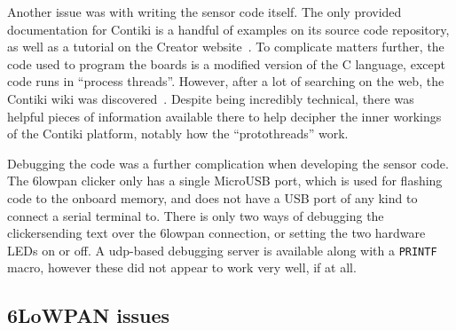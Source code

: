 Another issue was with writing the sensor code itself. The only provided
documentation for Contiki is a handful of examples on its source code
repository, as well as a tutorial on the Creator
website~\cite{clickersetupguide}. To complicate matters further, the code
used to program the boards is a modified version of the C language, except
code runs in ``process threads''. However, after a lot of searching on the
web, the Contiki wiki was discovered~\cite{contiki-wiki}. Despite being
incredibly technical, there was helpful pieces of information available there
to help decipher the inner workings of the Contiki platform, notably how the
``protothreads'' work.

Debugging the code was a further complication when developing the sensor
code. The \gls{6lowpan} clicker only has a single MicroUSB port, which is
used for flashing code to the onboard memory, and does not have a USB port of
any kind to connect a serial terminal to. There is only two ways of debugging
the clicker\textemdash{}sending text over the \gls{6lowpan} connection, or
setting the two hardware LEDs on or off. A \acrshort{udp}-based debugging
server is available along with a \texttt{PRINTF} macro, however these did not
appear to work very well, if at all.

\subsection{6LoWPAN issues}